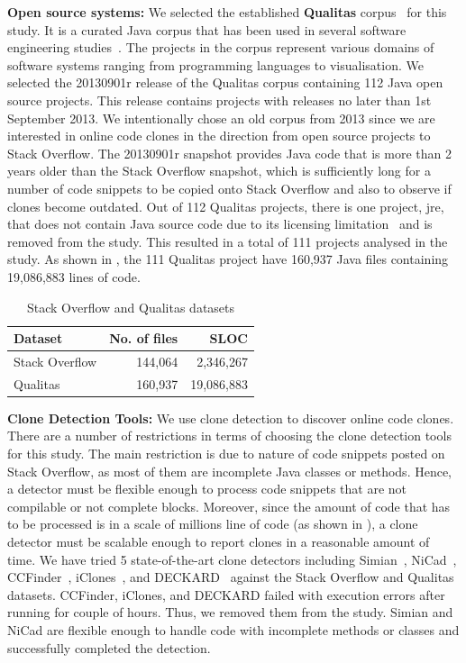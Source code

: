 \documentclass[sigconf,review, anonymous]{acmart}
\begin{document}
\textbf{Open source systems: }
We selected the established \textbf{Qualitas} corpus~\cite{QualitasCorpus} 
for this study. It is a curated Java corpus that has been used in several
software engineering
studies~\cite{Taube-Schock2011,Beckman2011,Vasilescu2011,Omar2012}. The
projects in the corpus represent various domains of software systems
ranging from programming languages to
visualisation. We selected the 20130901r release
of the Qualitas corpus containing 112 Java open source projects. This
release contains projects with releases no later than 1st September
2013. We intentionally chose an old corpus from 2013 since we are interested in
online code clones in the direction from open source projects to Stack
Overflow. The 20130901r snapshot provides Java code that is more than
2 years older than the Stack Overflow snapshot, which is sufficiently
long for a number of code snippets to be copied onto Stack Overflow
and also to observe if clones become outdated. Out of 112 Qualitas
projects, there is one project, \textsf{jre}, that does not contain
Java source code due to its licensing limitation~\cite{QualitasCorpus}
and is removed from the study. This resulted in a total of 111
projects analysed in the study. As shown in , the
111 Qualitas project have 160,937 Java files containing 19,086,883
lines of
code. %

\begin{table}
  \centering
  \caption{Stack Overflow and Qualitas datasets}
  \label{tab:datasets}
  \begin{tabular}{lrr}
    \hline 
    Dataset & No. of files & SLOC \\
    \hline
    Stack Overflow & 144,064 & 2,346,267 \\ 
    Qualitas &  160,937 & 19,086,883 \\ 
    \hline 
  \end{tabular} 
\end{table}

\textbf{Clone Detection Tools: }
We use clone detection to discover online code clones. 
There are a number of restrictions in terms of choosing the clone
detection tools for this study. The main restriction is due to nature
of code snippets posted on Stack Overflow, as most of them are
incomplete Java classes or methods. Hence, a detector must be flexible
enough to process code snippets that are not compilable or not
complete blocks. Moreover, since the amount of code that has to be
processed is in a scale of millions line of code (as shown in
), a clone detector must be scalable enough to
report clones in a reasonable amount of time. We have tried 5
state-of-the-art clone detectors including Simian~\cite{simian},
NiCad~\cite{Cordy,Roy2008}, CCFinder~\cite{Kamiya2002},
iClones~\cite{Gode2009}, and DECKARD~\cite{Jiang2007a} against the
Stack Overflow and Qualitas datasets. CCFinder, iClones, and DECKARD
failed with execution errors after running for couple of hours. Thus,
we removed them from the study. Simian and NiCad are flexible enough
to handle code with incomplete methods or classes and successfully
completed the detection.
\end{document}
